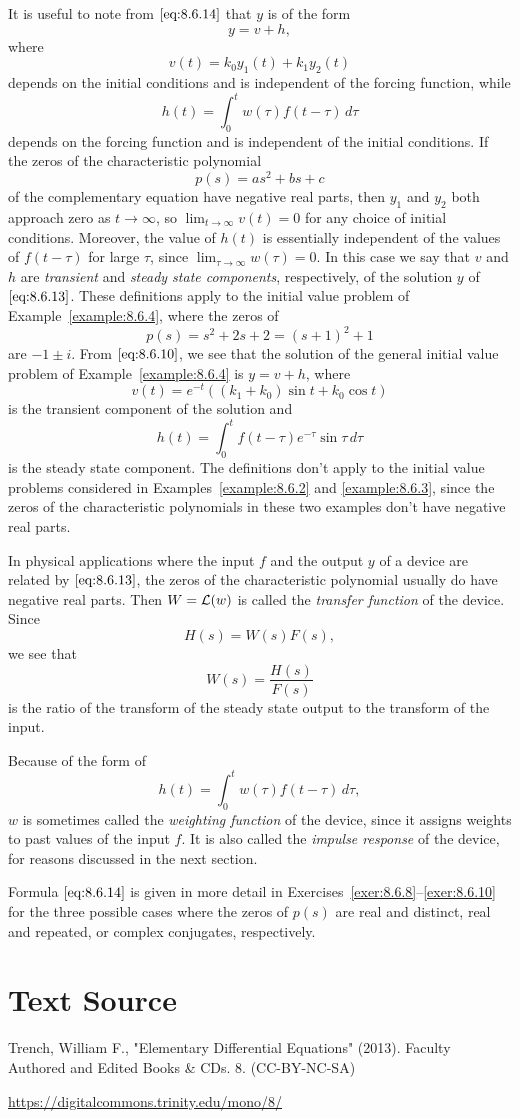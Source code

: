 \documentclass{ximera}
\begin{document}
It is useful to note from $\eqref{eq:8.6.14}$ that $y$ is of the form
$$
y=v+h,
$$
where
$$
v(t)=k_0y_1(t)+k_1y_2(t)
$$
depends on the initial conditions and is independent of the forcing
function, while
$$
h(t)=\int_0^tw(\tau)f(t-\tau)\,
d\tau
$$
depends on the forcing function and is independent of the initial
conditions. If the zeros of the characteristic polynomial
$$
p(s)=as^2+bs+c
$$
of the complementary equation have negative real parts, then $y_1$ and
$y_2$ both approach zero as $t\rightarrow\infty$, so $\lim_{t\rightarrow\infty}v(t)=0$
for any choice of initial conditions. Moreover, the value of $h(t)$ is
essentially independent of the values of $f(t-\tau)$ for large $\tau$,
since $\lim_{\tau\rightarrow\infty}w(\tau)=0$. In this case we say that $v$
and $h$ are \textit{transient} and \textit{steady state components},
respectively, of the solution $y$ of $\eqref{eq:8.6.13}$. These definitions
apply to the initial value problem of Example~\ref{example:8.6.4}, where
the zeros of
$$
p(s)=s^2+2s+2=(s+1)^2+1
$$
are $-1\pm i$. From  $\eqref{eq:8.6.10}$, we see that the solution of the
general initial value problem  of Example~\ref{example:8.6.4} is $y=v+h$,
where
$$
v(t)=e^{-t}\left((k_1+k_0)\sin t+k_0\cos t\right)
$$
is the transient component of the solution and
$$
h(t)=\int_0^t f(t-\tau)e^{-\tau}\sin\tau\,d\tau
$$
is the steady state component. The definitions don't apply to the initial
value problems  considered in Examples~\ref{example:8.6.2} and
\ref{example:8.6.3}, since the zeros of the characteristic polynomials
in these two examples don't have negative real parts.

In physical applications where the input $f$ and the output $y$ of a
device are related by $\eqref{eq:8.6.13}$, the zeros of the characteristic
polynomial usually do have negative real parts. Then $W={\cal L}(w)$
is called the \textit{transfer function} of the device. Since
$$
H(s)=W(s)F(s),
$$
we see that
$$
W(s)=\frac{H(s)}{F(s)}
$$
is the ratio of the transform of the steady state output to the transform
of the input.

 Because of the form of
$$
h(t)=\int_0^tw(\tau)f(t-\tau)\,d\tau,
$$
$w$ is sometimes called the \textit{weighting function} of the device,
since it assigns weights to past values of the input $f$. It is also
called the \textit{impulse response} of the device, for reasons
discussed in the next section.

Formula $\eqref{eq:8.6.14}$ is given in more detail in
Exercises~\ref{exer:8.6.8}--\ref{exer:8.6.10} for the three possible cases where the zeros of $p(s)$ are real and distinct, real and repeated, or
complex conjugates, respectively.

\section*{Text Source}
Trench, William F., "Elementary Differential Equations" (2013). Faculty Authored and Edited Books \& CDs. 8. (CC-BY-NC-SA)

\href{https://digitalcommons.trinity.edu/mono/8/}{https://digitalcommons.trinity.edu/mono/8/}
\end{document}

